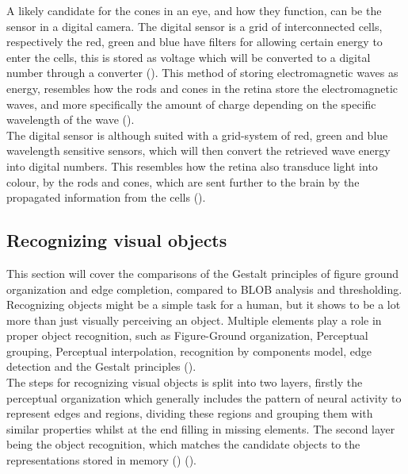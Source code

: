 \documentclass{article}
\newcommand{\goodcite}[1]{ {(\cite{#1})}}
\begin{document}
A likely candidate for the cones in an eye, and how they function, can be the sensor in a digital camera. The digital sensor is a grid of interconnected cells, respectively the red, green and blue have filters for allowing certain energy to enter the cells, this is stored as voltage which will be converted to a digital number through a converter\goodcite{IP}. This method of storing electromagnetic waves as energy, resembles how the rods and cones in the retina store the electromagnetic waves, and more specifically the amount of charge depending on the specific wavelength of the wave\goodcite{hsp}.\\The digital sensor is although suited with a grid-system of red, green and blue wavelength sensitive sensors, which will then convert the retrieved wave energy into digital numbers. This resembles how the retina also transduce light into colour, by the rods and cones, which are sent further to the brain by the propagated information from the cells\goodcite{hsp}. %


\subsection{Recognizing visual objects}%
This section will cover the comparisons of the Gestalt principles of figure ground organization and edge completion, compared to BLOB analysis and thresholding.\medskip\\

Recognizing objects might be a simple task for a human, but it shows to be a lot more than just visually perceiving an object. Multiple elements play a role in proper object recognition, such as Figure-Ground organization, Perceptual grouping, Perceptual interpolation, recognition by components model, edge detection and the Gestalt principles\goodcite{hsp}.\\
The steps for recognizing visual objects is split into two layers, firstly the perceptual organization which generally includes the pattern of neural activity to represent edges and regions, dividing these regions and grouping them with similar properties whilst at the end filling in missing elements. The second layer being the object recognition, which matches the candidate objects to the representations stored in memory\goodcite{hsp}\goodcite{bieder}.
\end{document}

